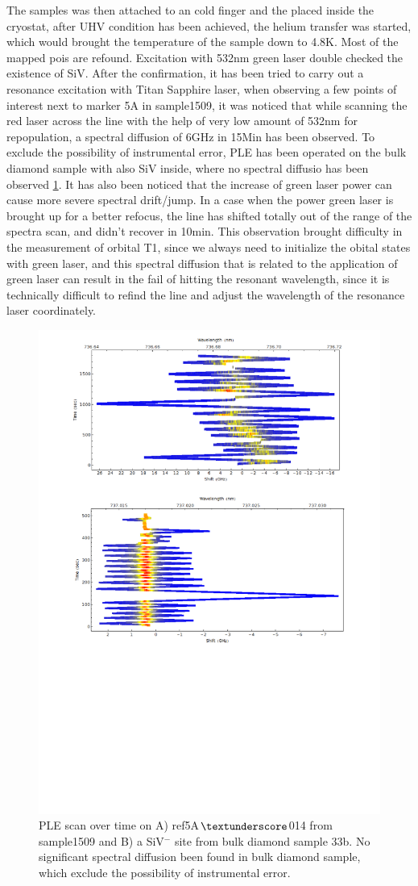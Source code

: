 The samples was then attached to an cold finger and the placed inside the cryostat, after UHV condition has been achieved, the helium transfer was started, which would brought the temperature of the sample down to 4.8K. Most of the mapped pois are refound. Excitation with 532nm green laser double checked the existence of SiV. After the confirmation, it has been tried to carry out a resonance excitation with Titan Sapphire laser, when observing a few points of interest next to marker 5A in sample1509, it was noticed that while scanning the red laser across the line with the help of very low amount of 532nm for repopulation, a spectral diffusion of 6GHz in 15Min has been observed. To exclude the possibility of instrumental error, PLE has been operated on the bulk diamond sample with also SiV inside, where no spectral diffusio has been observed \ref{fig:ple}. It has also been noticed that the increase of green laser power can cause more severe spectral drift/jump. In a case when the power green laser is brought up for a better refocus, the line has shifted totally out of the range of the spectra scan, and didn't recover in 10min. This observation brought difficulty in the measurement of orbital T1, since we always need to initialize the obital states with green laser, and this spectral diffusion that is related to the application of green laser can result in the fail of hitting the resonant wavelength, since it is technically difficult to refind the line and adjust the wavelength of the resonance laser coordinately. 

\begin{figure}[h]
\centering
\includegraphics[width=0.7\linewidth]{Figures/pic/PLE}
\caption{PLE scan over time on A) ref5A$\textunderscore$014 from sample1509 and B) a SiV$^{-}$ site from bulk diamond sample 33b. No significant spectral diffusion been found in bulk diamond sample, which exclude the possibility of instrumental error.}
\label{fig:ple}
\end{figure}

